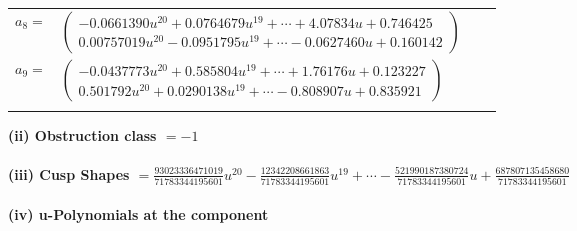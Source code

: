 \documentclass[1p]{elsarticle_modified}
\theoremstyle{definition}
\begin{document}
\begin{tabular}{m{7pt} m{180pt} m{7pt} m{180pt} }
\flushright $a_{8}=$&$\begin{pmatrix}-0.0661390 u^{20}+0.0764679 u^{19}+\cdots+4.07834 u+0.746425\\0.00757019 u^{20}-0.0951795 u^{19}+\cdots-0.0627460 u+0.160142\end{pmatrix}$ \\
\flushright $a_{9}=$&$\begin{pmatrix}-0.0437773 u^{20}+0.585804 u^{19}+\cdots+1.76176 u+0.123227\\0.501792 u^{20}+0.0290138 u^{19}+\cdots-0.808907 u+0.835921\end{pmatrix}$\\&\end{tabular}
\flushleft \textbf{(ii) Obstruction class $= -1$}\\~\\
\flushleft \textbf{(iii) Cusp Shapes $= \frac{93023336471019}{71783344195601} u^{20}-\frac{12342208661863}{71783344195601} u^{19}+\cdots-\frac{521990187380724}{71783344195601} u+\frac{687807135458680}{71783344195601}$}\\~\\
\newpage\renewcommand{\arraystretch}{1}
\flushleft \textbf{(iv) u-Polynomials at the component}\newline \\
\end{document}
